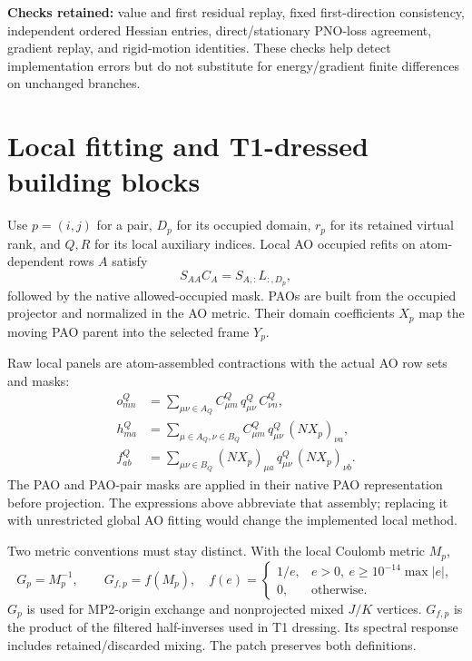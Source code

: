 \documentclass[10pt,letterpaper]{article}
\newcommand{\sectionpage}[1]{\newpage\section{#1}}
\begin{document}
\textbf{Checks retained:} value and first residual replay, fixed first-direction consistency, independent ordered Hessian entries, direct/stationary PNO-loss agreement, gradient replay, and rigid-motion identities. These checks help detect implementation errors but do not substitute for energy/gradient finite differences on unchanged branches.

\sectionpage{Local fitting and T1-dressed building blocks}
Use $p=(i,j)$ for a pair, $D_p$ for its occupied domain, $r_p$ for its retained virtual rank, and $Q,R$ for its local auxiliary indices. Local AO occupied refits on atom-dependent rows $A$ satisfy
\begin{equation}
S_{AA}C_A=S_{A,:}L_{:,D_p},
\end{equation}
followed by the native allowed-occupied mask. PAOs are built from the occupied projector and normalized in the AO metric. Their domain coefficients $X_p$ map the moving PAO parent into the selected frame $Y_p$.

Raw local panels are atom-assembled contractions with the actual AO row sets and masks:
\begin{align}
o^Q_{mn}&=\sum_{\mu\nu\in A_Q}C^Q_{\mu m}\,q^Q_{\mu\nu}\,C^Q_{\nu n},\\
h^Q_{ma}&=\sum_{\mu\in A_Q,\nu\in B_Q}C^Q_{\mu m}\,q^Q_{\mu\nu}\,(NX_p)_{\nu a},\\
f^Q_{ab}&=\sum_{\mu\nu\in B_Q}(NX_p)_{\mu a}\,q^Q_{\mu\nu}\,(NX_p)_{\nu b}.
\end{align}
The PAO and PAO-pair masks are applied in their native PAO representation before projection. The expressions above abbreviate that assembly; replacing it with unrestricted global AO fitting would change the implemented local method.

Two metric conventions must stay distinct. With the local Coulomb metric $M_p$,
\begin{equation}
G_p=M_p^{-1},\qquad G_{f,p}=f(M_p),\quad
f(e)=\begin{cases}1/e,&e>0,\ e\ge10^{-14}\max|e|,\\0,&\text{otherwise.}\end{cases}
\end{equation}
$G_p$ is used for MP2-origin exchange and nonprojected mixed $J/K$ vertices. $G_{f,p}$ is the product of the filtered half-inverses used in T1 dressing. Its spectral response includes retained/discarded mixing. The patch preserves both definitions.
\end{document}
